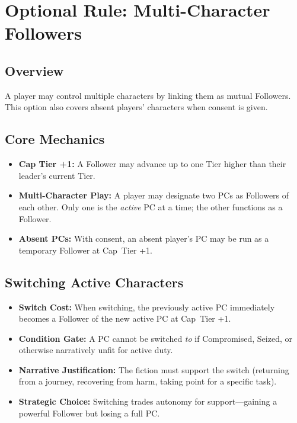 \section{Optional Rule: Multi-Character Followers}
\label{sec:multi-character-followers}

\subsection*{Overview}
A player may control multiple characters by linking them as mutual Followers. This option also covers absent players' characters when consent is given.

\subsection*{Core Mechanics}
\begin{itemize}
  \item \textbf{Cap Tier +1:} A Follower may advance up to one Tier higher than their leader’s current Tier.
  \item \textbf{Multi-Character Play:} A player may designate two PCs as Followers of each other. Only one is the \emph{active} PC at a time; the other functions as a Follower.
  \item \textbf{Absent PCs:} With consent, an absent player’s PC may be run as a temporary Follower at Cap~Tier +1.
\end{itemize}

\subsection*{Switching Active Characters}
\label{sec:switching-active-characters}
\begin{itemize}
  \item \textbf{Switch Cost:} When switching, the previously active PC immediately becomes a Follower of the new active PC at Cap~Tier +1.  
  \item \textbf{Condition Gate:} A PC cannot be switched \emph{to} if Compromised, Seized, or otherwise narratively unfit for active duty.  
  \item \textbf{Narrative Justification:} The fiction must support the switch (returning from a journey, recovering from harm, taking point for a specific task).  
  \item \textbf{Strategic Choice:} Switching trades autonomy for support—gaining a powerful Follower but losing a full PC.  
\end{itemize}

